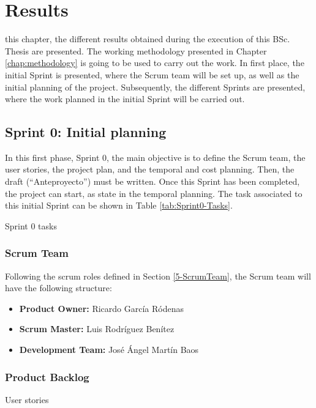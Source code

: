 \chapter{Results} %
\label{chap:results}

 this chapter, the different results obtained during the execution of this \ac{BSc.} Thesis are presented. The working methodology presented in Chapter \ref{chap:methodology} is going to be used to carry out the work. In first place, the initial Sprint is presented, where the Scrum team will be set up, as well as the initial planning of the project. Subsequently, the different Sprints are presented, where the work planned in the initial Sprint will be carried out.




\section{Sprint 0: Initial planning}
In this first phase, Sprint 0, the main objective is to define the Scrum team, the user stories, the project plan, and the temporal and cost planning. Then, the draft (“Anteproyecto”) must be written. Once this Sprint has been completed, the project can start, as state in the temporal planning. The task associated to this initial Sprint can be shown in Table \ref{tab:Sprint0-Tasks}.

\begin{table}[hp]
	\centering
	{\small
		
	}
	\caption{Sprint 0 tasks}
	\label{tab:Sprint0-Tasks}
\end{table}

\subsection{Scrum Team}
Following the scrum roles defined in Section \ref{5-ScrumTeam}, the Scrum team will have the following structure:
\begin{itemize}
	\item \textbf{Product Owner:} Ricardo García Ródenas
	\item \textbf{Scrum Master:} Luis Rodríguez Benítez
	\item \textbf{Development Team:} José Ángel Martín Baos
\end{itemize}

\subsection{Product Backlog}
\begin{table}[hp]
	\centering
	{\small
		
	}
	\caption{User stories}
	\label{tab:User-Stories}
\end{table}
	
